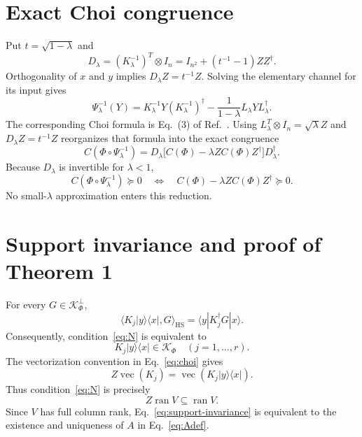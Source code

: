\documentclass[aip,jmp,preprint]{revtex4-2}
\newcommand{\K}{\mathcal{K}}
\newcommand{\ran}{\operatorname{ran}}
\begin{document}
\section{Exact Choi congruence}

Put $t=\sqrt{1-\lambda}$ and
\begin{equation}
 D_\lambda=(K_\lambda^{-1})^T\otimes I_n
 =I_{n^2}+(t^{-1}-1)ZZ^\dagger . \label{eq:D}
\end{equation}
Orthogonality of $x$ and $y$ implies $D_\lambda Z=t^{-1}Z$.  Solving the elementary channel for its input gives
\begin{equation}
 \Psi_\lambda^{-1}(Y)=K_\lambda^{-1}Y(K_\lambda^{-1})^\dagger
 -\frac{1}{1-\lambda}L_\lambda YL_\lambda^\dagger . \label{eq:inverse}
\end{equation}
The corresponding Choi formula is Eq.~(3) of Ref.~.  Using $L_\lambda^T\otimes I_n=\sqrt\lambda Z$ and $D_\lambda Z=t^{-1}Z$ reorganizes that formula into the exact congruence
\begin{equation}
 C(\Phi\circ\Psi_\lambda^{-1})
 =D_\lambda\bigl[C(\Phi)-\lambda ZC(\Phi)Z^\dagger\bigr]D_\lambda^\dagger . \label{eq:congruence}
\end{equation}
Because $D_\lambda$ is invertible for $\lambda<1$,
\begin{equation}
 C(\Phi\circ\Psi_\lambda^{-1})\succeq0
 \quad\Longleftrightarrow\quad
 C(\Phi)-\lambda ZC(\Phi)Z^\dagger\succeq0 . \label{eq:reduced-positivity}
\end{equation}
No small-$\lambda$ approximation enters this reduction.

\section{Support invariance and proof of Theorem 1}

For every $G\in\K_\Phi^\perp$,
\begin{equation}
 \langle K_j|y\rangle\langle x|,G\rangle_{\mathrm{HS}}
 =\langle y|K_j^\dagger G|x\rangle . \label{eq:HS}
\end{equation}
Consequently, condition~\eqref{eq:N} is equivalent to
\begin{equation}
 K_j|y\rangle\langle x|\in\K_\Phi
 \quad (j=1,\ldots,r). \label{eq:K-invariance}
\end{equation}
The vectorization convention in Eq.~\eqref{eq:choi} gives
\begin{equation}
 Z\operatorname{vec}(K_j)=
 \operatorname{vec}(K_j|y\rangle\langle x|).
\end{equation}
Thus condition~\eqref{eq:N} is precisely
\begin{equation}
 Z\ran V\subseteq\ran V. \label{eq:support-invariance}
\end{equation}
Since $V$ has full column rank, Eq.~\eqref{eq:support-invariance} is equivalent to the existence and uniqueness of $A$ in Eq.~\eqref{eq:Adef}.
\end{document}
